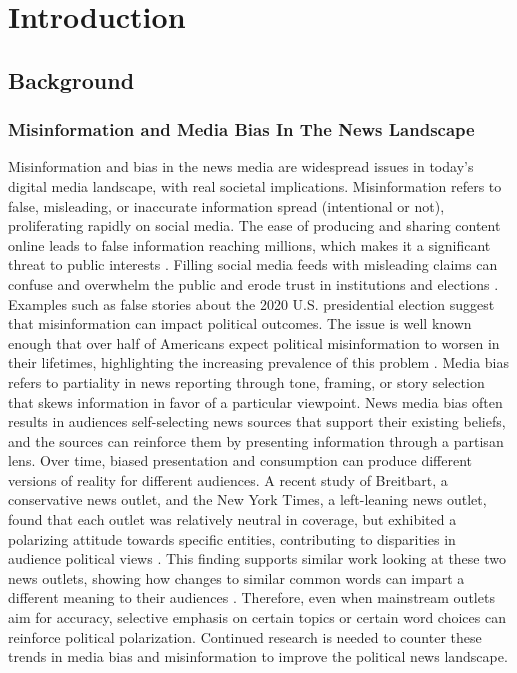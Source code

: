 \documentclass[11pt]{article}
\date{} %
\begin{document}
\section{Introduction}
\subsection{Background}

\subsubsection{\textbf{Misinformation and Media Bias In The News Landscape}}

Misinformation and bias in the news media are widespread issues in today's digital media landscape, with real societal implications. Misinformation refers to false, misleading, or inaccurate information spread (intentional or not), proliferating rapidly on social media. The ease of producing and sharing content online leads to false information reaching millions, which makes it a significant threat to public interests \cite{r1}.
Filling social media feeds with misleading claims can confuse and overwhelm the public and erode trust in institutions and elections \cite{r2}. Examples such as false stories about the 2020 U.S. presidential election suggest that misinformation can impact political outcomes. The issue is well known enough that over half of Americans expect political misinformation to worsen in their lifetimes, highlighting the increasing prevalence of this problem \cite{r3}\cite{r4}. 
Media bias refers to partiality in news reporting through tone, framing, or story selection that skews information in favor of a particular viewpoint. News media bias often results in audiences self-selecting news sources that support their existing beliefs, and the sources can reinforce them by presenting information through a partisan lens. Over time, biased presentation and consumption can produce different versions of reality for different audiences.
A recent study of Breitbart, a conservative news outlet, and the New York Times, a left-leaning news outlet, found that each outlet was relatively neutral in coverage, but exhibited a polarizing attitude towards specific entities, contributing to disparities in audience political views \cite{r5}. This finding supports similar work looking at these two news outlets, showing how changes to similar common words can impart a different meaning to their audiences \cite{r6}. Therefore, even when mainstream outlets aim for accuracy, selective emphasis on certain topics or certain word choices can reinforce political polarization. Continued research is needed to counter these trends in media bias and misinformation to improve the political news landscape.
\end{document}
